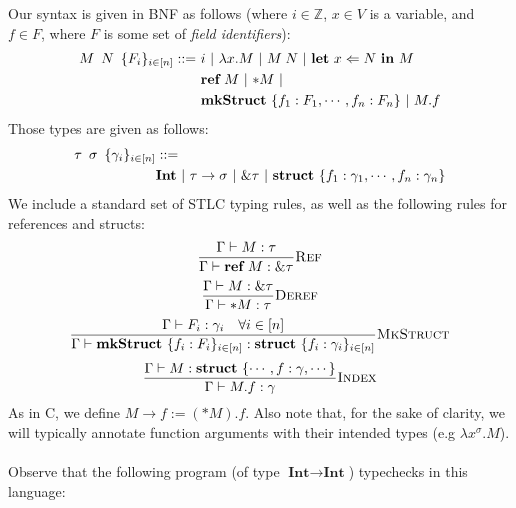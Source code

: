 \documentclass{article}
\newcommand{\agap}{\hspace{0.25em}}
\newcommand{\mkref}{\textbf{ref}~}
\newcommand{\deref}{\mathbf{*}}
\begin{document}
Our syntax is given in BNF as follows (where $i \in \mathbb{Z}$, $x \in V$ is a variable, and $f \in F$, where $F$ is some set of \emph{field identifiers}):
\begin{align*}
    M \hspace{0.5em} N \hspace{0.5em} \{F_i\}_{i \in [n]} ::=~ &i ~|~ \lambda x . M ~|~ M \agap N ~|~ \textbf{let}~ x \Leftarrow N ~\textbf{in}~ M\\
    &\mkref M ~|~ \deref M ~|~\\
    &\textbf{mkStruct} ~\{ f_1 : F_1, \cdots, f_n : F_n \} ~|~ M.f
\end{align*}
Those types are given as follows:
\begin{align*}
    \tau \hspace{0.5em} \sigma \hspace{0.5em} \{ \gamma_i \}_{i \in [n]} &::=\\ 
    &\textbf{Int} ~|~ \tau \rightarrow \sigma ~|~ \& \tau ~|~ \textbf{struct} ~\{ f_1 :  \gamma_1, \cdots, f_n : \gamma_n\}
\end{align*}
We include a standard set of STLC typing rules, as well as the following rules for references and structs:
\begin{equation*}
    \frac{\Gamma \vdash M : \tau}{\Gamma \vdash \mkref M : \& \tau}\textsc{Ref}
\end{equation*}
\begin{equation*}
    \frac{\Gamma \vdash M : \& \tau}{\Gamma \vdash \deref M : \tau}\textsc{Deref}
\end{equation*}
\begin{equation*}
    \frac{\Gamma \vdash F_i : \gamma_i \hspace{1em} \forall i \in [n]}{\Gamma \vdash \textbf{mkStruct} ~\{ f_i : F_i \}_{i \in [n]} : \textbf{struct} ~\{ f_i : \gamma_i \}_{i \in [n]} }\textsc{MkStruct}
\end{equation*}
\begin{equation*}
    \frac{\Gamma \vdash M : \textbf{struct} ~\{ \cdots, f : \gamma, \cdots \}}{\Gamma \vdash M.f : \gamma }\textsc{Index}
\end{equation*}
As in C, we define $M \!\! \rightarrow \!\! f := (*M).f$. Also note that, for the sake of clarity, we will typically annotate function arguments with their intended types (e.g $\lambda x^\sigma . M$).
\\~\\
Observe that the following program (of type $\textbf{Int} \rightarrow \textbf{Int}$) typechecks in this language:
\end{document}
